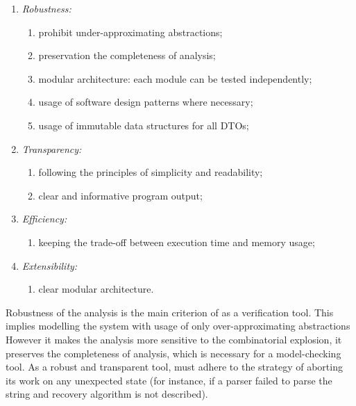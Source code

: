 \vspace{0.5em}
\begin{enumerate}[nolistsep]
  \item \textit{Robustness:}
    \begin{enumerate}[label*=\arabic*.]
      \item prohibit under-approximating abstractions;
      \item preservation the completeness of analysis;
      \item modular architecture: each module can be tested independently;
      \item usage of software design patterns where necessary;
      \item usage of immutable data structures for all DTOs;
    \end{enumerate}
  \item \textit{Transparency:}
    \begin{enumerate}[label*=\arabic*.]
      \item following the principles of simplicity and readability;
      \item clear and informative program output;
    \end{enumerate}
  \item \textit{Efficiency:}
    \begin{enumerate}[label*=\arabic*.]%
      \item keeping the trade-off between execution time and memory usage;
    \end{enumerate}
  \item \textit{Extensibility:}
    \begin{enumerate}[label*=\arabic*.]%
      \item clear modular architecture.
    \end{enumerate}
\end{enumerate}

Robustness of the analysis is the main criterion of \porthos[2] as a verification tool.
This implies modelling the system with usage of only over-approximating abstractions 
However it makes the analysis more sensitive to the combinatorial explosion, it preserves the completeness of analysis, which is necessary for a model-checking tool.
As a robust and transparent tool, \porthos[2] must adhere to the strategy of aborting its work on any unexpected state (for instance, if a parser failed to parse the string and recovery algorithm is not described).

